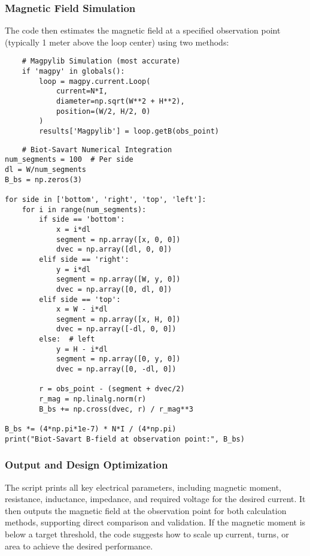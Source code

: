 \subsubsection{Magnetic Field Simulation}
The code then estimates the magnetic field at a specified observation point (typically 1 meter above the loop center) using two methods:

\begin{verbatim}
    # Magpylib Simulation (most accurate)
    if 'magpy' in globals():
        loop = magpy.current.Loop(
            current=N*I,
            diameter=np.sqrt(W**2 + H**2),
            position=(W/2, H/2, 0)
        )
        results['Magpylib'] = loop.getB(obs_point)
\end{verbatim}

\begin{verbatim}
    # Biot-Savart Numerical Integration
num_segments = 100  # Per side
dl = W/num_segments
B_bs = np.zeros(3)

for side in ['bottom', 'right', 'top', 'left']:
    for i in range(num_segments):
        if side == 'bottom':
            x = i*dl
            segment = np.array([x, 0, 0])
            dvec = np.array([dl, 0, 0])
        elif side == 'right':
            y = i*dl
            segment = np.array([W, y, 0])
            dvec = np.array([0, dl, 0])
        elif side == 'top':
            x = W - i*dl
            segment = np.array([x, H, 0])
            dvec = np.array([-dl, 0, 0])
        else:  # left
            y = H - i*dl
            segment = np.array([0, y, 0])
            dvec = np.array([0, -dl, 0])
        
        r = obs_point - (segment + dvec/2)
        r_mag = np.linalg.norm(r)
        B_bs += np.cross(dvec, r) / r_mag**3

B_bs *= (4*np.pi*1e-7) * N*I / (4*np.pi)
print("Biot-Savart B-field at observation point:", B_bs)

\end{verbatim}

\subsubsection{Output and Design Optimization}
The script prints all key electrical parameters, including magnetic moment, resistance, inductance, impedance, and required voltage for the desired current. It then outputs the magnetic field at the observation point for both calculation methods, supporting direct comparison and validation. If the magnetic moment is below a target threshold, the code suggests how to scale up current, turns, or area to achieve the desired performance.


